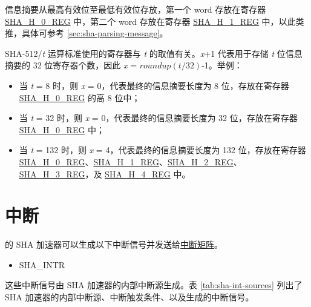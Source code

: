 \documentclass[main\_\_CN.tex]{subfiles}
\begin{document}
\begin{table}[H]
\begin{threeparttable}
    \begin{tablenotes}
        \item[1] 信息摘要从最高有效位至最低有效位存放，第一个 word 存放在寄存器 \hyperref[regdesc:SHAHNREG]{SHA\_H\_0\_REG} 中，第二个 word 存放在寄存器 \hyperref[regdesc:SHAHNREG]{SHA\_H\_1\_REG} 中，以此类推，具体可参考 \ref{sec:sha-parsing-message}。
        \item[2] SHA-512/{\it{t}} 运算标准使用的寄存器与 {\it{t}} 的取值有关。{\it{x}}+1 代表用于存储 {\it{t}} 位信息摘要的 32 位寄存器个数，因此 {\it{x}} = \begin{math}roundup(t/32)\end{math}-1。举例：
        \begin{itemize}
            \item 当 {\it{t}} = 8 时，则 {\it{x}} = 0，代表最终的信息摘要长度为 8 位，存放在寄存器 \hyperref[regdesc:SHAHNREG]{SHA\_H\_0\_REG} 的高 8 位中；
            \item 当 {\it{t}} = 32 时，则 {\it{x}} = 0，代表最终的信息摘要长度为 32 位，存放在寄存器 \hyperref[regdesc:SHAHNREG]{SHA\_H\_0\_REG} 中；
            \item 当 {\it{t}} = 132 时，则 {\it{x}} = 4，代表最终的信息摘要长度为 132 位，存放在寄存器 \hyperref[regdesc:SHAHNREG]{SHA\_H\_0\_REG}、\hyperref[regdesc:SHAHNREG]{SHA\_H\_1\_REG}、\hyperref[regdesc:SHAHNREG]{SHA\_H\_2\_REG}、\hyperref[regdesc:SHAHNREG]{SHA\_H\_3\_REG}，及 \hyperref[regdesc:SHAHNREG]{SHA\_H\_4\_REG} 中。
        \end{itemize}
    \end{tablenotes}

    \end{threeparttable}
\end{table}



\section{中断}

\chipname{} 的 SHA 加速器可以生成以下中断信号并发送给\hyperref[mod:intmtrx]{中断矩阵}。

    \begin{itemize}
        \item SHA\_INTR
    \end{itemize}

这些中断信号由 SHA 加速器的内部中断源生成。表 \ref{tab:sha-int-sources} 列出了 SHA 加速器的内部中断源、中断触发条件、以及生成的中断信号。
\end{document}
